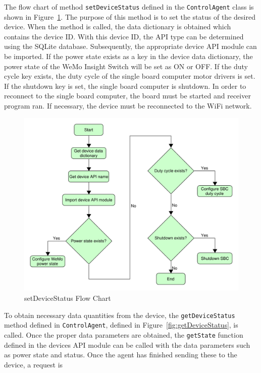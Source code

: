 \documentclass[conference]{IEEEtran}
\begin{document}
The flow chart of method \texttt{setDeviceStatus} defined in the \texttt{ControlAgent} class is shown in
Figure~\ref{fig:setDeviceStatus}. The purpose of this method is to set the
status of the desired device. When the method is called, the data dictionary is
obtained which contains the device ID. With this device ID, the API type can be
determined using the SQLite database. Subsequently, the appropriate device API
module can be imported. If the power state exists as a key in the device data
dictionary, the power state of the WeMo Insight Switch will be set as ON or OFF.
If the duty cycle key exists, the duty cycle of the single board computer motor
drivers is set. If the shutdown key is set, the single board computer is
shutdown. In order to reconnect to the single board computer, the board must be
started and receiver program ran. If necessary, the device must be reconnected
to the WiFi network. %
%
\begin{figure}[htbp]
    \centering
    \includegraphics[scale=0.2]{figs/agents/setDeviceStatus.pdf}
    \caption{setDeviceStatus Flow Chart}
    \label{fig:setDeviceStatus}
\end{figure}
%
To obtain necessary data quantities from the device, the
\texttt{getDeviceStatus} method defined in \texttt{ControlAgent}, defined in Figure~\ref{fig:getDeviceStatus}, is called. Once the proper data parameters are
obtained, the \texttt{getState} function defined in the devices API module can
be called with the data parameters such as power state and
status. Once the agent has finished sending these to the device, a request is
\end{document}
